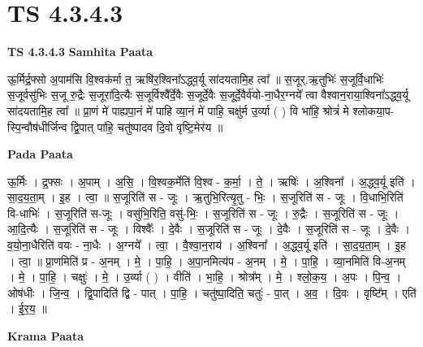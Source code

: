 \documentclass[17pt]{extarticle}
\begin{document}
\section{ TS 4.3.4.3 }

\textbf{TS 4.3.4.3 } \newline
\textbf{Samhita Paata} \newline

ऊ॒र्मिर्द्र॒फ्सो अ॒पाम॑सि वि॒श्वक॑र्मा त॒ ऋषि॑र॒श्विना᳚ऽद्ध्व॒र्यू सा॑दयतामि॒ह त्वा᳚ ॥ स॒जूर्.ऋ॒तुभिः॑ स॒जूर्वि॒धाभिः॑ स॒जूर्वसु॑भिः स॒जू रु॒द्रैः स॒जूरा॑दि॒त्यैः स॒जूर्विश्वै᳚र्दे॒वैः स॒जूर्दे॒वैः स॒जूर्दे॒वैर्व॑यो-ना॒धैर॒ग्नये᳚ त्वा वैश्वान॒राया॒श्विना᳚ऽद्ध्व॒र्यू सा॑दयतामि॒ह त्वा᳚ ॥ प्रा॒णं मे॑ पाह्यपा॒नं मे॑ पाहि व्या॒नं मे॑ पाहि॒ चक्षु॑र्म उ॒र्व्या ( ) वि भा॑हि॒ श्रोत्रं॑ मे श्लोकया॒प-स्पि॒न्वौष॑धीर्जिन्व द्वि॒पात् पा॑हि॒ चतु॑ष्पादव दि॒वो वृष्टि॒मेर॑य ॥ \newline

\textbf{Pada Paata} \newline

ऊ॒र्मिः । द्र॒फ्सः । अ॒पाम् । अ॒सि॒ । वि॒श्वक॒र्मेति॑ वि॒श्व - क॒र्मा॒ । ते॒ । ऋषिः॑ । अ॒श्विना᳚ । अ॒द्ध्व॒र्यू इति॑ । सा॒द॒य॒ता॒म् । इ॒ह । त्वा॒ ॥ स॒जूरिति॑ स - जूः । ऋ॒तुभि॒रित्यृ॒तु - भिः॒ । स॒जूरिति॑ स - जूः । वि॒धाभि॒रिति॑ वि-धाभिः॑ । स॒जूरिति॑ स-जूः । वसु॑भि॒रिति॒ वसु॑-भिः॒ । स॒जूरिति॑ स - जूः । रु॒द्रैः । स॒जूरिति॑ स - जूः । आ॒दि॒त्यैः । स॒जूरिति॑ स - जूः । विश्वैः᳚ । दे॒वैः । स॒जूरिति॑ स - जूः । दे॒वैः । स॒जूरिति॑ स - जूः । दे॒वैः । व॒यो॒ना॒धैरिति॑ वयः - ना॒धैः । अ॒ग्नये᳚ । त्वा॒ । वै॒श्वा॒न॒राय॑ । अ॒श्विना᳚ । अ॒द्ध्व॒र्यू इति॑ । सा॒द॒य॒ता॒म् । इ॒ह । त्वा॒ ॥ प्रा॒णमिति॑ प्र - अ॒नम् । मे॒ । पा॒हि॒ । अ॒पा॒नमित्य॑प - अ॒नम् । मे॒ । पा॒हि॒ । व्या॒नमिति॑ वि-अ॒नम् । मे॒ । पा॒हि॒ । चक्षुः॑ । मे॒ । उ॒र्व्या ( ) । वीति॑ । भा॒हि॒ । श्रोत्र᳚म् । मे॒ । श्लो॒क॒य॒ । अ॒पः । पि॒न्व॒ । ओष॑धीः । जि॒न्व॒ । द्वि॒पादिति॑ द्वि - पात् । पा॒हि॒ । चतु॑ष्पा॒दिति॒ चतुः॑ - पा॒त् । अ॒व॒ । दि॒वः । वृष्टि᳚म् । एति॑ । ई॒र॒य॒ ॥  \newline


\textbf{Krama Paata} \newline
\end{document}
